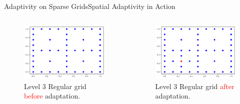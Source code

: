 \begin{frame}{Adaptivity on Sparse Grids}{Spatial Adaptivity in Action}
    \begin{columns}
        \begin{column}{0.5\textwidth}
            \begin{figure}
                \centering
                \includegraphics[width=\textwidth]{figures/before_refinement.pdf}
                \caption{Level 3 Regular grid \textcolor{red}{before} adaptation.}
            \end{figure}
        \end{column}
        \begin{column}{0.5\textwidth}
            \begin{figure}
                \centering
                \includegraphics[width=\textwidth]{figures/refinement_0.pdf}
                \caption{Level 3 Regular grid \textcolor{red}{after} adaptation.}
            \end{figure}
        \end{column}
    \end{columns}
\end{frame}